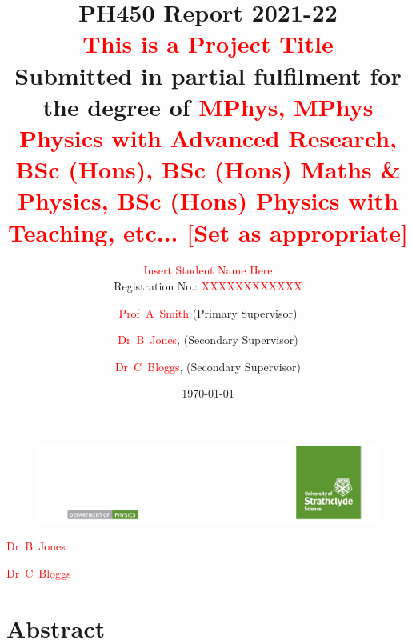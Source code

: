 \documentclass[aps,pra,a4paper,nofootinbib,onecolumn,tightenlines,longbibliography,12pt,amsfonts,amssymb,amsmath,floatfix]{revtex4-2} %
\newcommand{\projecttitle}{\textcolor{red}{This is a Project Title}}%
\newcommand{\studentname}{\textcolor{red}{Insert Student Name Here}}%
\newcommand{\regnumber}{\textcolor{red}{XXXXXXXXXXXX}}
\newcommand{\degree}{\textcolor{red}{MPhys, MPhys Physics with Advanced Research, BSc (Hons),  BSc (Hons) Maths \& Physics, BSc (Hons) Physics with Teaching, etc... [Set as appropriate]}}
\newcommand{\primarysup}{\textcolor{red}{Prof~A~Smith}}
\newcommand{\secondsup}{\textcolor{red}{Dr~B~Jones}}%
\newcommand{\thirdsup}{\textcolor{red}{Dr~C~Bloggs}}%
\begin{document}

\begin{figure}
\includegraphics[width=\textwidth]{ScienceLogo.png}
\end{figure}

\title{PH450 Report 2021-22\\ \vspace{1cm}
{\huge \projecttitle}\\[0.5cm] %
{\footnotesize Submitted in partial fulfilment for the degree of \degree}}

\author{\studentname\\
Registration No.: \regnumber}

\author{\primarysup{} (Primary Supervisor)}
\noaffiliation
\ifdefined\secondsup %
\author{\secondsup, (Secondary Supervisor)} %
\noaffiliation
\fi
\ifdefined\thirdsup
\author{\thirdsup, (Secondary Supervisor)} %
\noaffiliation
\fi

\date{\today}


\maketitle

\newpage %


\section*{Abstract} %
\end{document}
